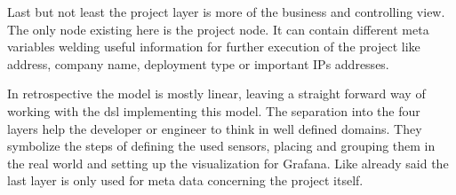 Last but not least the project layer is more of the business and controlling view. The only node existing here is the project node. It can contain different meta variables welding useful information for further execution of the project like address, company name, deployment type or important \glspl{IP} addresses. 

In retrospective the model is mostly linear, leaving a straight forward way of working with the \gls{dsl} implementing this model. The separation into the four layers help the developer or engineer to think in well defined domains. They symbolize the steps of defining the used sensors, placing and grouping them in the real world and setting up the visualization for Grafana. Like already said the last layer is only used for meta data concerning the project itself.

